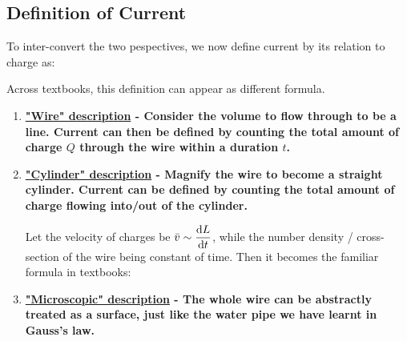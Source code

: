 \documentclass[class=article, crop=false, 12pt]{standalone}
\begin{document}


\subsection{Definition of Current}

To inter-convert the two pespectives, 
we now define current by its relation to charge as:
\begin{center}
\end{center}

Across textbooks, this definition can appear as different formula.
\begin{enumerate}
    \item \bf{\ul{"Wire" description}} - 
    Consider the volume to flow through to be a line. 
    Current can then be defined by counting the total amount of charge $Q$ through the wire within a duration $t$. 

    \item \bf{\ul{"Cylinder" description}} - 
    Magnify the wire to become a straight cylinder.
    Current can be defined by counting the total amount of charge 
    flowing into/out of the cylinder. 

    Let the  velocity of charges be $\bar{v}\sim\dvv{L}{t}$,
    while the number density / cross-section of the wire being constant of time. 
    Then it becomes the familiar formula in textbooks:


    \item \bf{\ul{"Microscopic" description}} - The whole wire can be abstractly treated as a surface,
    just like the water pipe we have learnt in Gauss's law. 


\end{enumerate}
\end{document}
